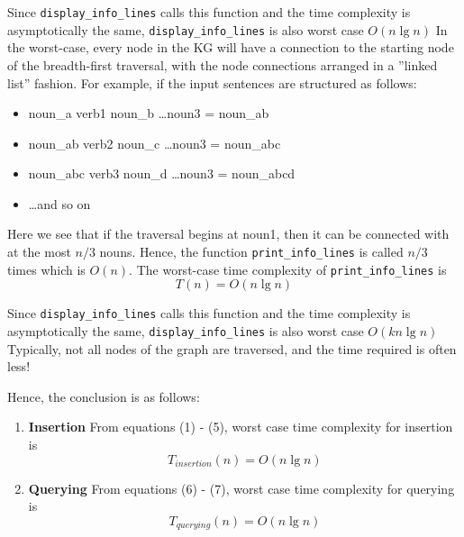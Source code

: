 \documentclass[conference]{IEEEtran}
\begin{document}
\begin{enumerate}
\begin{itemize}
Since \texttt{display\_info\_lines} calls this function
and the time complexity is asymptotically the same,
\texttt{display\_info\_lines} is also worst case $O(n \lg n)$
In the worst-case, every node in the KG will have a
connection to the starting node of the breadth-first traversal,
with the node connections arranged in a ”linked list” fashion.
For example, if the input sentences are structured as follows:
\begin{itemize}
    \item noun\_a   verb1 noun\_b   \ldots noun3 = noun\_ab
    \item noun\_ab  verb2 noun\_c   \ldots noun3 = noun\_abc
    \item noun\_abc verb3 noun\_d   \ldots noun3 = noun\_abcd
    \item \ldots and so on
\end{itemize}
Here we see that if the traversal begins at noun1, then it can
be connected with at the most $n/3$ nouns. Hence, the function
\texttt{print\_info\_lines} is called $n/3$ times which is $O(n)$.
The worst-case time complexity of \texttt{print\_info\_lines} is
\begin{equation}
    T(n) = O(n\lg n)
\end{equation}
\end{itemize}
\end{enumerate}
Since \texttt{display\_info\_lines} calls this function and the time complexity is asymptotically the same, \texttt{display\_info\_lines} is also worst case $O(kn \lg n)$
Typically, not all nodes of the graph are traversed, and the
time required is often less!

Hence, the conclusion is as follows:
\begin{enumerate}
    \item \textbf{Insertion} From equations (1) - (5), worst case time complexity for insertion is 
    \begin{equation*}
        T_{insertion}(n) = O(n\lg n) 
    \end{equation*}

    \item \textbf{Querying} From equations (6) - (7), worst case time complexity for querying is 
    \begin{equation*}
        T_{querying}(n) = O(n\lg n) 
    \end{equation*}
\end{enumerate}
\end{document}
